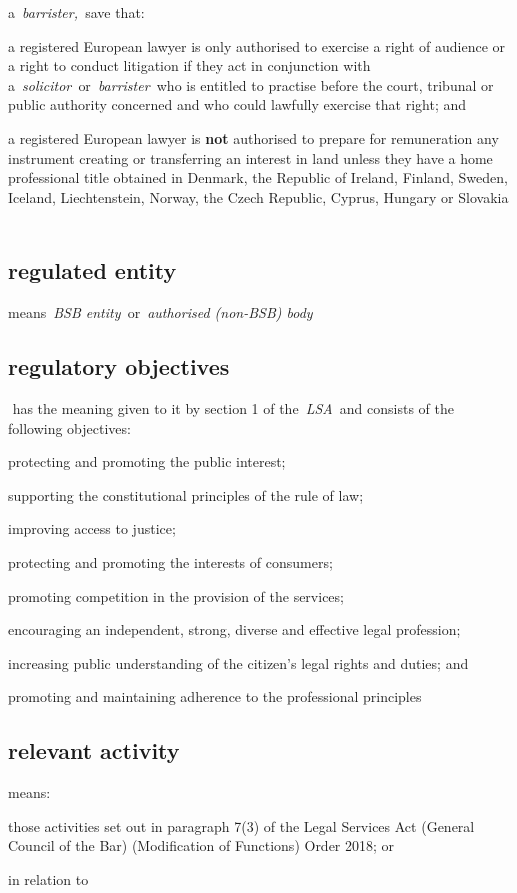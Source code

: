   a~\emph{barrister,~}save that: \al \item a registered European lawyer is only
  authorised to exercise a right of audience or a right to conduct
  litigation if they act in conjunction with
  a~\emph{solicitor~}or~\emph{barrister~}who is entitled to practise
  before the court, tribunal or public authority concerned and who could
  lawfully exercise that right; and
   \item a registered European lawyer is
  \textbf{not} authorised to prepare for remuneration any instrument creating or
  transferring an interest in land unless they have a home professional
  title obtained in Denmark, the Republic of Ireland, Finland, Sweden,
  Iceland, Liechtenstein, Norway, the Czech Republic, Cyprus, Hungary or
  Slovakia
  \la  \subsection{regulated entity } means~\emph{BSB
  entity~}or~\emph{authorised (non-BSB) body} \subsection{regulatory objectives } has the meaning given to it by
  section 1 of the~\emph{LSA~}and consists of the following
  objectives: \al \item protecting and promoting the public interest; \item
  supporting the constitutional principles of the rule of law; \item
  improving access to justice; \item protecting and promoting the interests
  of consumers; \item promoting competition in the provision of the
  services; \item encouraging an independent, strong, diverse and effective
  legal profession; \item increasing public understanding of the citizen's
  legal rights and duties; and \item promoting and maintaining adherence to
  the professional principles\la  \subsection{relevant activity } means: \al \item those activities set out in
  paragraph 7(3) of the Legal Services Act (General Council of the Bar)
  (Modification of Functions) Order 2018; or \item in relation to

